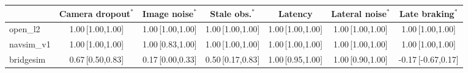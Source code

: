 \begin{tabular}{@{}lcccccc@{}}
\toprule
 & Camera dropout$^{\ast}$ & Image noise$^{\ast}$ & Stale obs.$^{\ast}$ & Latency & Lateral noise$^{\ast}$ & Late braking$^{\ast}$ \\
\midrule
open\_l2 & 1.00\,{\scriptsize[1.00,1.00]} & 1.00\,{\scriptsize[1.00,1.00]} & 1.00\,{\scriptsize[1.00,1.00]} & 1.00\,{\scriptsize[1.00,1.00]} & 1.00\,{\scriptsize[1.00,1.00]} & 1.00\,{\scriptsize[1.00,1.00]} \\
navsim\_v1 & 1.00\,{\scriptsize[1.00,1.00]} & 1.00\,{\scriptsize[0.83,1.00]} & 1.00\,{\scriptsize[1.00,1.00]} & 1.00\,{\scriptsize[1.00,1.00]} & 1.00\,{\scriptsize[1.00,1.00]} & 1.00\,{\scriptsize[1.00,1.00]} \\
bridgesim & 0.67\,{\scriptsize[0.50,0.83]} & 0.17\,{\scriptsize[0.00,0.33]} & 0.50\,{\scriptsize[0.17,0.83]} & 1.00\,{\scriptsize[0.95,1.00]} & 1.00\,{\scriptsize[0.90,1.00]} & -0.17\,{\scriptsize[-0.67,0.17]} \\
\bottomrule
\end{tabular}
